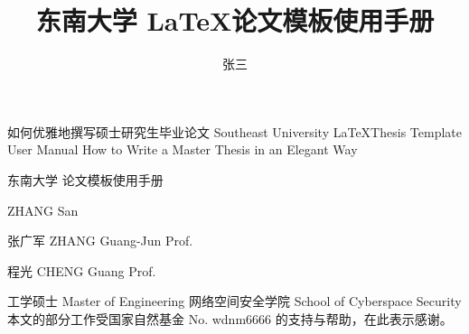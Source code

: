 \documentclass[algorithmlist,figurelist,tablelist,nomlist]{seumasterthesis}
\begin{document}

\title
    {东南大学 \LaTeX 论文模板使用手册}                                         %
    {如何优雅地撰写硕士研究生毕业论文}                                          %
    {Southeast University \LaTeX Thesis Template User Manual}    %
    {How to Write a Master Thesis in an Elegant Way}            %

\spine
    {东南大学  论文模板使用手册}                      %
    {}                                                          %

\author
    {张三}                        %
    {ZHANG San}                 %

\advisor
    {张广军}                       %
    {ZHANG Guang-Jun}           %
    {Prof.}                     %

\coadvisor
    {程光}                        %
    {CHENG Guang}               %
    {Prof.}                     %

\degreetype                     %
    {工学硕士}
    {Master of Engineering}
\submajor{}                     %
\authorizedate{\today}          %
\committeechair{}               %
\reviewer{}{}                   %
\department                     %
    {网络空间安全学院}
    {School of Cyberspace Security}
\seuthesisthanks                %
    {本文的部分工作受国家自然基金 No. wdnm6666 的支持与帮助，在此表示感谢。}
\end{document}
